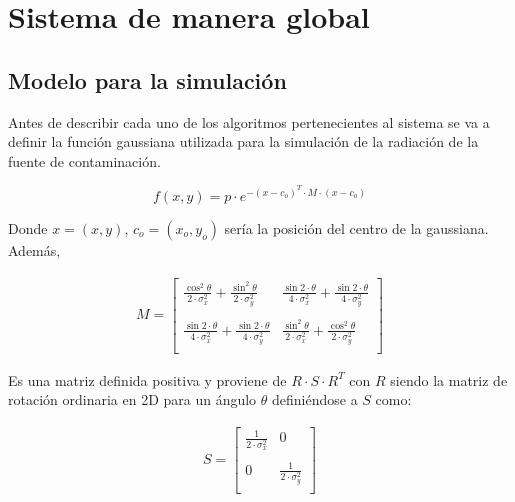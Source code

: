 
\newpage
\thispagestyle{empty}
\mbox{}
\chapter{Sistema de manera global}
\label{ch:chapter2}

\section{Modelo para la simulación} \label{Simulacion_Modelo}

Antes de describir cada uno de los algoritmos pertenecientes al sistema se va a definir la función gaussiana utilizada para la simulación de la radiación de la fuente de contaminación.

\begin{equation} \label{Funcion_Gaussiana} 
	f\left(x,y\right) = p\cdot{e}^{-\left(x-c_o\right)^{T}\cdot{M}\cdot\left(x-c_{o}\right)}
\end{equation}

Donde $x=\left(x,y\right)$, $c_o=\left(x_{o},y_{o}\right)$ sería la posición del centro de la gaussiana. Además, 

\begin{equation}
	\begin{aligned}
	M= 	
	\begin{bmatrix}
		\frac{\cos^{2}{\theta}}{2\cdot{\sigma^{2}_{x}}}+ \frac{\sin^{2}{\theta}}{2\cdot{\sigma^{2}_{y}}} & \frac{\sin{2\cdot\theta}}{4\cdot{\sigma^{2}_{x}}}+ \frac{\sin{2\cdot\theta}}{4\cdot{\sigma^{2}_{y}}}\\\\
		
		\frac{\sin{2\cdot\theta}}{4\cdot{\sigma^{2}_{x}}}+ \frac{\sin{2\cdot\theta}}{4\cdot{\sigma^{2}_{y}}} & \frac{\sin^{2}{\theta}}{2\cdot{\sigma^{2}_{x}}}+ \frac{\cos^{2}{\theta}}{2\cdot{\sigma^{2}_{y}}}\\
	\end{bmatrix}
	\end{aligned}
\end{equation}

Es una matriz definida positiva y proviene de $R\cdot{S}\cdot{R}^{T}$ con $R$ siendo la matriz de rotación ordinaria en 2D para un ángulo $\theta$ definiéndose a $S$ como:

\begin{equation}
		\begin{aligned}
	S= 	
	\begin{bmatrix}
		\frac{1}{2\cdot{\sigma^{2}_{x}}} & 0\\\\
		0 & \frac{1}{2\cdot{\sigma^{2}_{y}}}\\
	\end{bmatrix}
	\end{aligned}
\end{equation}


